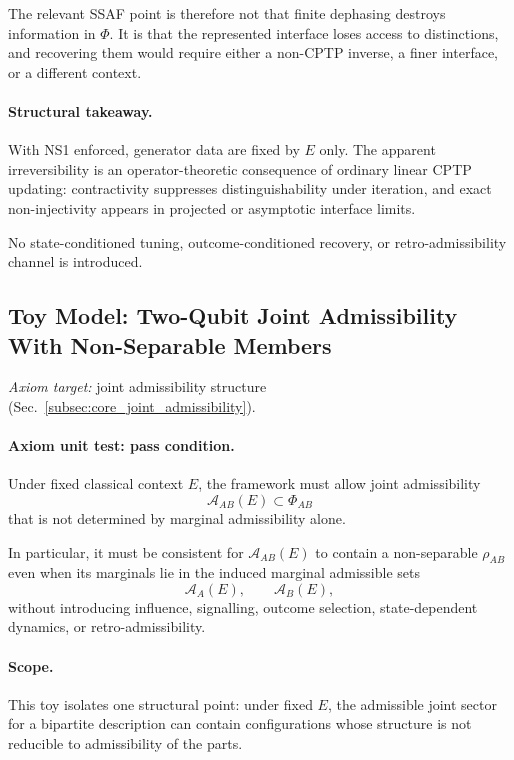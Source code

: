 \documentclass[aps,prx,onecolumn,11pt]{revtex4-2}
\theoremstyle{plain}
\theoremstyle{definition}
\theoremstyle{remark}
\begin{document}
The relevant SSAF point is therefore not that finite dephasing destroys
information in \(\Phi\). It is that the represented interface loses
access to distinctions, and recovering them would require either a
non-CPTP inverse, a finer interface, or a different context.

\paragraph{Structural takeaway.}

With NS1 enforced, generator data are fixed by \(E\) only. The apparent
irreversibility is an operator-theoretic consequence of ordinary linear
CPTP updating: contractivity suppresses distinguishability under
iteration, and exact non-injectivity appears in projected or asymptotic
interface limits.

No state-conditioned tuning, outcome-conditioned recovery, or
retro-admissibility channel is introduced.

\subsection{Toy Model: Two-Qubit Joint Admissibility With Non-Separable Members}
\label{toy:two_qubit_joint_admissibility_without_factorization}

\noindent\emph{Axiom target:} joint admissibility structure (Sec.~\ref{subsec:core_joint_admissibility}).

\paragraph{Axiom unit test: pass condition.}

Under fixed classical context \(E\), the framework must allow joint
admissibility
\[
\mathcal A_{AB}(E)\subset\Phi_{AB}
\]
that is not determined by marginal admissibility alone.

In particular, it must be consistent for \(\mathcal A_{AB}(E)\) to
contain a non-separable \(\rho_{AB}\) even when its marginals lie in the
induced marginal admissible sets
\[
\mathcal A_A(E),
\qquad
\mathcal A_B(E),
\]
without introducing influence, signalling, outcome selection,
state-dependent dynamics, or retro-admissibility.

\paragraph{Scope.}

This toy isolates one structural point: under fixed \(E\), the
admissible joint sector for a bipartite description can contain
configurations whose structure is not reducible to admissibility of the
parts.
\end{document}
